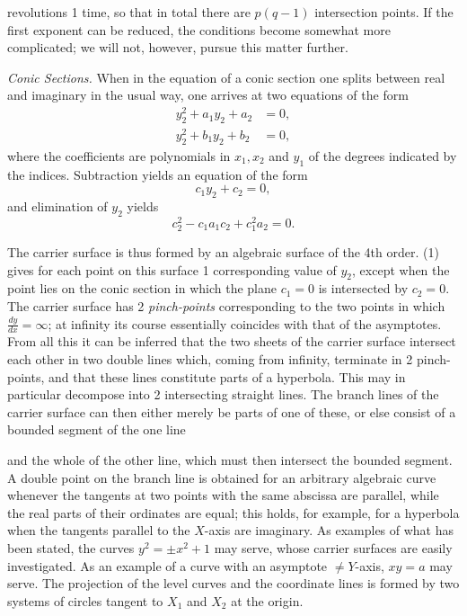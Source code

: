 \documentclass{article}
\begin{document}
revolutions 1 time, so that in total there are $p(q - 1)$ intersection points. If the first exponent can be reduced, the conditions become somewhat more complicated; we will not, however, pursue this matter further.

\emph{Conic Sections.} When in the equation of a conic section one splits between real and imaginary in the usual way, one arrives at two equations of the form
\[
\begin{aligned}
y_2^2 + a_1 y_2 + a_2 &= 0, \\
y_2^2 + b_1 y_2 + b_2 &= 0,
\end{aligned}
\]
where the coefficients are polynomials in $x_1, x_2$ and $y_1$ of the degrees indicated by the indices. Subtraction yields an equation of the form
\[
c_1 y_2 + c_2 = 0, \tag{1}
\]
and elimination of $y_2$ yields
\[
c_2^2 - c_1 a_1 c_2 + c_1^2 a_2 = 0. \tag{2}
\]

The carrier surface is thus formed by an algebraic surface of the 4th order. (1) gives for each point on this surface 1 corresponding value of $y_2$, except when the point lies on the conic section in which the plane $c_1 = 0$ is intersected by $c_2 = 0$. The carrier surface has 2 \emph{pinch-points} corresponding to the two points in which $\frac{dy}{dx} = \infty$; at infinity its course essentially coincides with that of the asymptotes. From all this it can be inferred that the two sheets of the carrier surface intersect each other in two double lines which, coming from infinity, terminate in 2 pinch-points, and that these lines constitute parts of a hyperbola. This may in particular decompose into 2 intersecting straight lines. The branch lines of the carrier surface can then either merely be parts of one of these, or else consist of a bounded segment of the one line

and the whole of the other line, which must then intersect the bounded segment. A double point on the branch line is obtained for an arbitrary algebraic curve whenever the tangents at two points with the same abscissa are parallel, while the real parts of their ordinates are equal; this holds, for example, for a hyperbola when the tangents parallel to the $X$-axis are imaginary. As examples of what has been stated, the curves $y^2 = \pm x^2 + 1$ may serve, whose carrier surfaces are easily investigated. As an example of a curve with an asymptote $\neq Y$-axis, $xy = a$ may serve. The projection of the level curves and the coordinate lines is formed by two systems of circles tangent to $X_1$ and $X_2$ at the origin.
\end{document}
